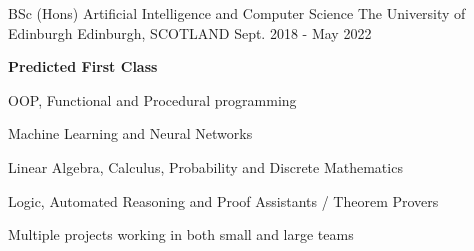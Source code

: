 \begin{cventries}
  \cventry
    {BSc (Hons) Artificial Intelligence and Computer Science} %
    {The University of Edinburgh} %
    {Edinburgh, SCOTLAND} %
    {Sept. 2018 - May 2022} %
    {
        \textbf{Predicted First Class}
        \vspace{1.35em}
        \begin{cvitems} %
            \item OOP, Functional and Procedural programming
            \item Machine Learning and Neural Networks
            \item Linear Algebra, Calculus, Probability and Discrete Mathematics
            \item Logic, Automated Reasoning and Proof Assistants / Theorem  Provers
            \item Multiple projects working in both small and large teams
        \end{cvitems}
    }
\end{cventries}
